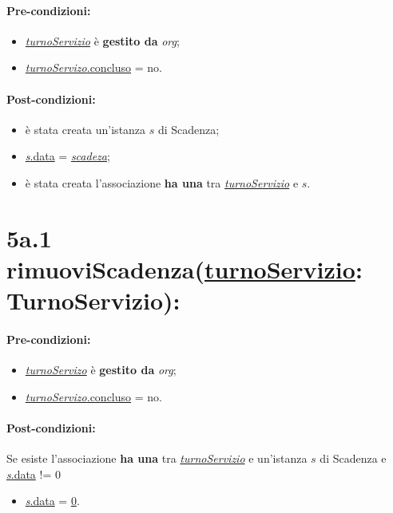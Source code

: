{\paragraph{Pre-condizioni:}
\begin{itemize}
     \item \underline{\textit{turnoServizio}} è \textbf{gestito da} {\textit{org}};
   \item \underline{\textit{turnoServizo}.concluso} = no.
\end{itemize}

\paragraph{Post-condizioni:}  
\begin{itemize}
 \item è stata creata un'istanza $s$ di Scadenza;
 \item \underline{\textit{s}.data} = \underline{\textit{scadeza}};
 \item è stata creata l'associazione \textbf{ha una} tra \underline{\textit{turnoServizio}} e $s$.
\end{itemize}

\section*{5a.1 rimuoviScadenza(\underline{turnoServizio}: TurnoServizio):}

\paragraph{Pre-condizioni:}
\begin{itemize}
     \item \underline{\textit{turnoServizo}} è \textbf{gestito da} {\textit{org}};
   \item \underline{\textit{turnoServizo}.concluso} = no.
\end{itemize}

\paragraph{Post-condizioni:} Se esiste l'associazione \textbf{ha una} tra \underline{\textit{turnoServizio}} e un'istanza $s$ di Scadenza e \underline{\textit{s}.data} != 0

\begin{itemize}
    \item \underline{\textit{s}.data} = \underline{0}.
\end{itemize}

}
